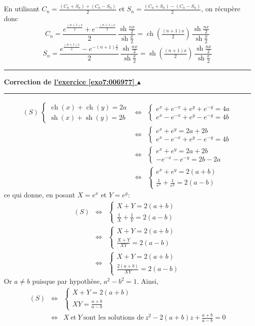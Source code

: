 \documentclass[11pt,a4paper]{article}
\newcommand{\ch}{\mathop{\mathrm{ch}}\nolimits}
\newcommand{\sh}{\mathop{\mathrm{sh}}\nolimits}
\newcounter{exo}
\newcommand{\correction}[1]{\hypertarget{cor7:#1}{}\label{cor7:#1}{\bf Correction de \hyperlink{exo7:#1}{l'exercice \ref{exo7:#1} $\blacktriangle$}}\vspace{1mm}\hrule\vspace{1mm}}
\newcommand{\fincorrection}{\vspace{1mm}\hrule\vspace*{7mm}}
\begin{document}
En utilisant $C_n=\frac{(C_n+S_n)+(C_n-S_n)}{2}$ et $S_n=\frac{(C_n+S_n)-(C_n-S_n)}{2}$, on récupère donc
$$C_n=\frac{e^{\frac{(n+1)x}{2}}+e^{-\frac{(n+1)x}{2}}}{2}\,\frac{\sh\frac{nx}{2}}{\sh\frac{x}{2}}=\ch\left(\tfrac{(n+1)x}{2}\right)\,\frac{\sh\frac{nx}{2}}{\sh\frac{x}{2}}$$
$$S_n=\frac{e^{\frac{(n+1)x}{2}}-e^{-(n+1)\frac x2}}{2}\,\frac{\sh\frac{nx}{2}}{\sh\frac{x}{2}}=\sh\left(\tfrac{(n+1)x}{2}\right)\,\frac{\sh\frac{nx}{2}}{\sh\frac{x}{2}}$$
\fincorrection
\correction{006977}
\begin{eqnarray*}
(S)\ \left\{\begin{array}{l}
\ch(x)+\ch(y)=2a\\
\sh(x)+\sh(y)=2b
\end{array}\right.
&\Longleftrightarrow&
\left\{\begin{array}{l}
e^x+e^{-x}+e^y+e^{-y}=4a\\
e^x-e^{-x}+e^y-e^{-y}=4b
\end{array}\right.\\
 &\Longleftrightarrow&
\left\{\begin{array}{l}
e^x+e^y=2a+2b\\
e^x-e^{-x}+e^y-e^{-y}=4b
\end{array}\right.\\
 &\Longleftrightarrow&
\left\{\begin{array}{l}
e^x+e^y=2a+2b\\
-e^{-x}-e^{-y}=2b-2a
\end{array}\right.\\
 &\Longleftrightarrow&
\left\{\begin{array}{l}
e^x+e^y=2(a+b)\\
\frac{1}{e^{x}}+\frac{1}{e^{y}}=2(a-b)
\end{array}\right.
\end{eqnarray*}
ce qui donne, en posant  $X=e^x$ et $Y=e^y$:
\begin{eqnarray*}
(S)&\Longleftrightarrow&
\left\{\begin{array}{l}
X+Y=2(a+b)\\
\frac{1}{X}+\frac{1}{Y}=2(a-b)
\end{array}\right.\\
&\Longleftrightarrow&
\left\{\begin{array}{l}
X+Y=2(a+b)\\
\frac{X+Y}{XY}=2(a-b)
\end{array}\right.\\
&\Longleftrightarrow&
\left\{\begin{array}{l}
X+Y=2(a+b)\\
\frac{2(a+b)}{XY}=2(a-b)
\end{array}\right.
\end{eqnarray*}
Or $a\not=b$ puisque par hypothèse, $a^2-b^2=1$. Ainsi,
\begin{eqnarray*}
(S)&\Longleftrightarrow&
\left\{\begin{array}{l}
X+Y=2(a+b)\\
XY=\frac{a+b}{a-b}
\end{array}\right.\\
&\Longleftrightarrow& X\ \text{et}\ Y\ \text{sont les solutions de}\ z^2-2(a+b)z+\frac{a+b}{a-b}=0
\end{eqnarray*}
\end{document}
